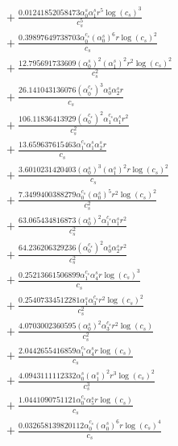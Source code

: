 \documentclass[10pt]{article}
\begin{document}
\begin{align*}
&{}  + \frac{0.01241852058473 \alpha_{0}^s \alpha_{1}^s r^{5} \log{\left(c_{s} \right)}^{3}}{c_{s}^{5}} \\
&{}  + \frac{0.39897649738703 \alpha_{0}^{c_s} \left(\alpha_{0}^s\right)^{6} r \log{\left(c_{s} \right)}^{2}}{c_{s}} \\
&{}  + \frac{12.795691733609 \left(\alpha_{0}^s\right)^{2} \left(\alpha_{1}^s\right)^{2} r^{2} \log{\left(c_{s} \right)}^{2}}{c_{s}^{2}} \\
&{}  + \frac{26.141043136076 \left(\alpha_{0}^{c_s}\right)^{3} \alpha_{0}^s \alpha_{2}^s r}{c_{s}} \\
&{}  + \frac{106.11836413929 \left(\alpha_{0}^{c_s}\right)^{2} \alpha_{1}^{c_s} \alpha_{1}^s r^{2}}{c_{s}^{2}} \\
&{}  + \frac{13.659637615463 \alpha_{1}^{c_s} \alpha_{1}^s \alpha_{2}^s r}{c_{s}} \\
&{}  + \frac{3.6010231420403 \left(\alpha_{0}^s\right)^{3} \left(\alpha_{1}^s\right)^{2} r \log{\left(c_{s} \right)}^{2}}{c_{s}} \\
&{}  + \frac{7.3499400388279 \alpha_{0}^{c_s} \left(\alpha_{0}^s\right)^{5} r^{2} \log{\left(c_{s} \right)}^{2}}{c_{s}^{2}} \\
&{}  + \frac{63.065434816873 \left(\alpha_{0}^s\right)^{2} \alpha_{1}^{c_s} \alpha_{1}^s r^{2}}{c_{s}^{2}} \\
&{}  + \frac{64.236206329236 \left(\alpha_{0}^{c_s}\right)^{2} \alpha_{0}^s \alpha_{2}^s r^{2}}{c_{s}^{2}} \\
&{}  + \frac{0.25213661506899 \alpha_{1}^{c_s} \alpha_{4}^s r \log{\left(c_{s} \right)}^{3}}{c_{s}} \\
&{}  + \frac{0.25407334512281 \alpha_{1}^s \alpha_{3}^{c_s} r^{2} \log{\left(c_{s} \right)}^{2}}{c_{s}^{2}} \\
&{}  + \frac{4.0703002360595 \left(\alpha_{0}^s\right)^{2} \alpha_{3}^{c_s} r^{2} \log{\left(c_{s} \right)}}{c_{s}^{2}} \\
&{}  + \frac{2.0442655416859 \alpha_{1}^{c_s} \alpha_{4}^s r \log{\left(c_{s} \right)}}{c_{s}} \\
&{}  + \frac{4.0943111112332 \alpha_{0}^s \left(\alpha_{1}^s\right)^{2} r^{3} \log{\left(c_{s} \right)}^{2}}{c_{s}^{3}} \\
&{}  + \frac{1.0441090751121 \alpha_{0}^{c_s} \alpha_{5}^s r \log{\left(c_{s} \right)}}{c_{s}} \\
&{}  + \frac{0.032658139820112 \alpha_{0}^{c_s} \left(\alpha_{0}^s\right)^{6} r \log{\left(c_{s} \right)}^{4}}{c_{s}} \\

\end{align*}
\end{document}
